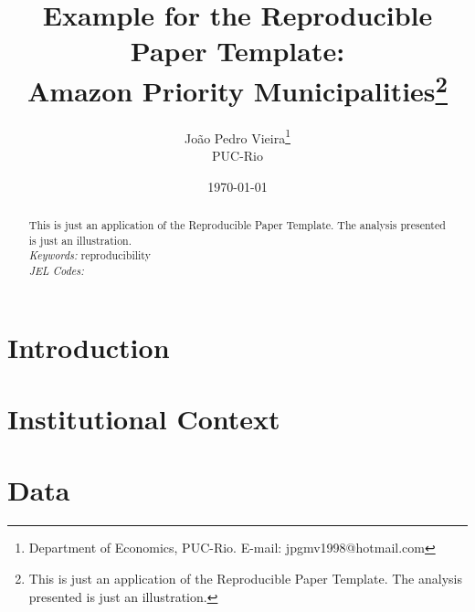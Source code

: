 \documentclass[12pt, a4paper, hidelinks]{article}
\begin{document}
\begin{titlepage}
\title{\Large \textbf{Example for the Reproducible Paper Template:}\\ \large \textbf{Amazon Priority Municipalities}\thanks{This is just an application of the Reproducible Paper Template. The analysis presented is just an illustration.}}
\author{João Pedro Vieira\thanks{Department of Economics, PUC-Rio. E-mail: jpgmv1998@hotmail.com} \\ \large PUC-Rio}
\date{\today}

\maketitle

\begin{abstract}
\noindent This is just an application of the Reproducible Paper Template. The analysis presented is just an illustration.  \\ %


\noindent\textit{Keywords:} reproducibility \\
\noindent\textit{JEL Codes:} \\
\end{abstract}
\setcounter{page}{0}
\thispagestyle{empty}
\end{titlepage}
\pagebreak \newpage

\section{Introduction} \label{sec:introduction}

\citep{assunccao2019getting}

\setlength{\parskip}{0.5em} %

\section{Institutional Context} \label{sec:institutional}

\section{Data} \label{sec:data}

\citep{ibge2015muni, ibge2019biome, mma2017list, inpe2020prodes}
\end{document}
